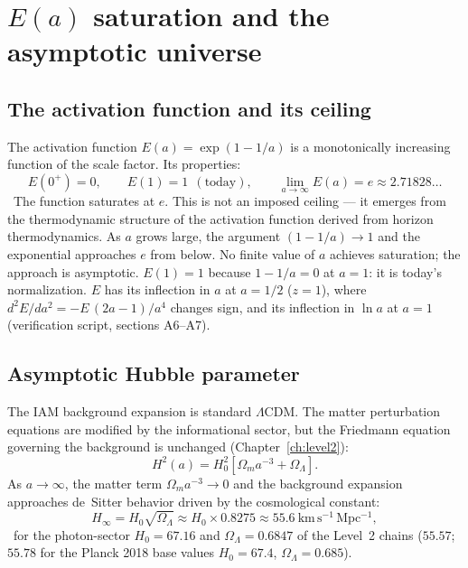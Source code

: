 \section{$E(a)$ saturation and the asymptotic universe}\label{sec:de_saturation}
\subsection{The activation function and its ceiling}
The activation function $E(a)=\exp(1-1/a)$ is a monotonically increasing function of the scale factor. Its properties:
\begin{equation}E(0^+)=0,\qquad E(1)=1\ \ (\text{today}),\qquad\lim_{a\to\infty}E(a)=e\approx2.71828\ldots\label{eq:de_Elimits}\end{equation}
\derived\ The function saturates at $e$. This is not an imposed ceiling --- it emerges from the thermodynamic structure of the activation function
derived from horizon thermodynamics. As $a$ grows large, the argument $(1-1/a)\to1$ and the exponential approaches $e$ from below. No finite value
of $a$ achieves saturation; the approach is asymptotic. $E(1)=1$ because $1-1/a=0$ at $a=1$: it is today's normalization. $E$ has its inflection
in $a$ at $a=1/2$ ($z=1$), where $d^2E/da^2=-E\,(2a-1)/a^4$ changes sign, and its inflection in $\ln a$ at $a=1$ (verification script, sections
A6--A7). \derived

\subsection{Asymptotic Hubble parameter}\label{sec:de_Hinf}
The IAM background expansion is standard $\Lambda$CDM. The matter perturbation equations are modified by the informational sector, but the
Friedmann equation governing the background is unchanged (Chapter~\ref{ch:level2}):
\begin{equation}H^2(a)=H_0^2\left[\Omega_ma^{-3}+\Omega_\Lambda\right].\label{eq:de_friedmann}\end{equation}
As $a\to\infty$, the matter term $\Omega_ma^{-3}\to0$ and the background expansion approaches de~Sitter behavior driven by the cosmological
constant:
\begin{equation}H_\infty=H_0\sqrt{\Omega_\Lambda}\approx H_0\times0.8275\approx55.6~\mathrm{km\,s^{-1}\,Mpc^{-1}},\label{eq:de_Hinf}\end{equation}
\calc\ for the photon-sector $H_0=67.16$ and $\Omega_\Lambda=0.6847$ of the Level~2 chains ($55.57$; $55.78$ for the Planck 2018 base values
$H_0=67.4$, $\Omega_\Lambda=0.685$).

